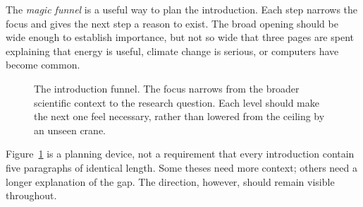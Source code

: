 \documentclass[masters,en,listoffigures,listoftables,acronyms]{NMBU}
\begin{document}
The \emph{magic funnel} is a useful way to plan the introduction.
Each step narrows the focus and gives the next step a reason to exist.
The broad opening should be wide enough to establish importance, but not so wide that three pages are spent explaining that energy is useful, climate change is serious, or computers have become common.

\begin{figure}[!h]
  \centering
  \caption[The introduction funnel]{The introduction funnel. The focus narrows from the broader scientific context to the research question. Each level should make the next one feel necessary, rather than lowered from the ceiling  by an unseen crane.}
  \label{fig:funnel}
\end{figure}

Figure~\ref{fig:funnel} is a planning device, not a requirement that every introduction contain five paragraphs of identical length.
Some theses need more context; others need a longer explanation of the gap.
The direction, however, should remain visible throughout.
\end{document}
